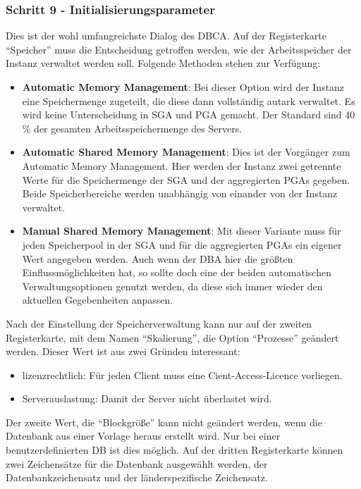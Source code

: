         \subsubsection{Schritt 9 - Initialisierungsparameter}
          Dies ist der wohl umfangreichste Dialog des DBCA. Auf der
          Registerkarte \enquote{Speicher} muss die Entscheidung getroffen
          werden, wie der Arbeitsspeicher der Instanz verwaltet werden soll.
          Folgende Methoden stehen zur Verfügung:
          \begin{itemize}
            \item \textbf{Automatic Memory Management}: Bei dieser Option wird der Instanz eine Speichermenge zugeteilt, die diese dann vollständig autark verwaltet. Es wird keine Unterscheidung in SGA und PGA gemacht. Der Standard sind 40 \% der gesamten Arbeitsspeichermenge des Servers.
            \item \textbf{Automatic Shared Memory Management}: Dies ist der Vorgänger zum Automatic Memory Management. Hier werden der Instanz zwei getrennte Werte für die Speichermenge der SGA und der aggregierten PGAs gegeben. Beide Speicherbereiche werden unabhängig von einander von der Instanz verwaltet.
\clearpage
            \item \textbf{Manual Shared Memory Management}: Mit dieser Variante
            muss für jeden Speicherpool in der SGA und für die aggregierten
            PGAs ein eigener Wert angegeben werden. Auch wenn der DBA hier die
            größten Einflussmöglichkeiten hat, so sollte doch eine der
            beiden automatischen Verwaltungsoptionen genutzt werden, da diese
            sich immer wieder den aktuellen Gegebenheiten anpassen.
          \end{itemize}
          Nach der Einstellung der Speicherverwaltung kann nur auf der zweiten
          Registerkarte, mit dem Namen \enquote{Skalierung}, die Option
          \enquote{Prozesse} geändert werden. Dieser Wert ist aus zwei
          Gründen interessant:
          \begin{itemize}
            \item lizenzrechtlich: Für jeden Client muss eine
            Cient-Access-Licence vorliegen.
            \item Serverauslastung: Damit der Server nicht überlastet wird.
          \end{itemize}
          Der zweite Wert, die \enquote{Blockgröße} kann nicht geändert
          werden, wenn die Datenbank aus einer Vorlage heraus erstellt wird. Nur
          bei einer benutzerdefinierten DB ist dies möglich.
          Auf der dritten Registerkarte können zwei Zeichensätze für die
          Datenbank ausgewählt werden, der Datenbankzeichensatz und der
          länderspezifische Zeichensatz.

